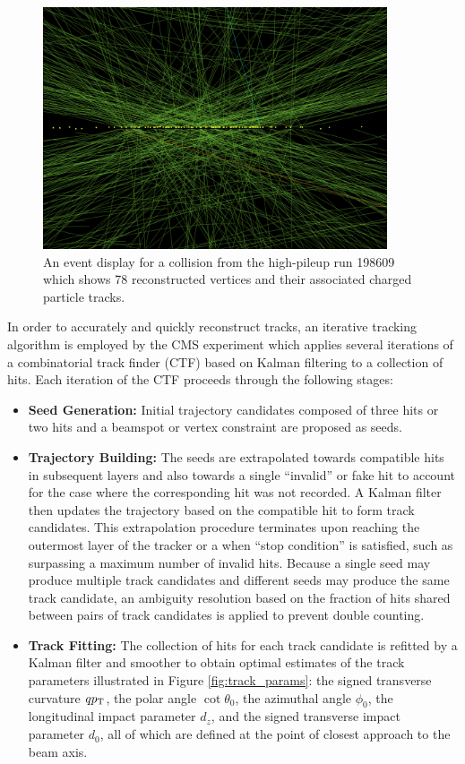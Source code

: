 \begin{figure}[htbp]
  \centering
    \includegraphics[width=4in]{images/pileup}
    \caption[Event Display of High-Pileup Collision Event]{An event display for a collision from the high-pileup run 198609 which shows 78 reconstructed vertices and their associated charged particle tracks.\cite{pileup}}
    \label{fig:pileup}
\end{figure}

In order to accurately and quickly reconstruct tracks, an iterative tracking algorithm\cite{ITERTRACK} is employed by the CMS experiment which applies several iterations of a combinatorial track finder (CTF) based on Kalman filtering\cite{CMSTRACKRECO} to a collection of hits. Each iteration of the CTF proceeds through the following stages:

\begin{itemize}
  \item \textbf{Seed Generation:} Initial trajectory candidates composed of three hits or two hits and a beamspot or vertex constraint are proposed as seeds.
  \item \textbf{Trajectory Building:} The seeds are extrapolated towards compatible hits in subsequent layers and also towards a single ``invalid'' or fake hit to account for the case where the corresponding hit was not recorded. A Kalman filter then updates the trajectory based on the compatible hit to form track candidates. This extrapolation procedure terminates upon reaching the outermost layer of the tracker or a when ``stop condition'' is satisfied, such as surpassing a maximum number of invalid hits. Because a single seed may produce multiple track candidates and different seeds may produce the same track candidate, an ambiguity resolution based on the fraction of hits shared between pairs of track candidates is applied to prevent double counting.
  \item \textbf{Track Fitting:} The collection of hits for each track candidate is refitted by a Kalman filter and smoother to obtain optimal estimates of the track parameters illustrated in Figure \ref{fig:track_params}: the signed transverse curvature $qp_{\mathrm{T}}$, the polar angle $\cot \theta_{0}$, the azimuthal angle $\phi_{0}$, the longitudinal impact parameter $d_{z}$, and the signed transverse impact parameter $d_{0}$, all of which are defined at the point of closest approach to the beam axis.
\end{itemize}

